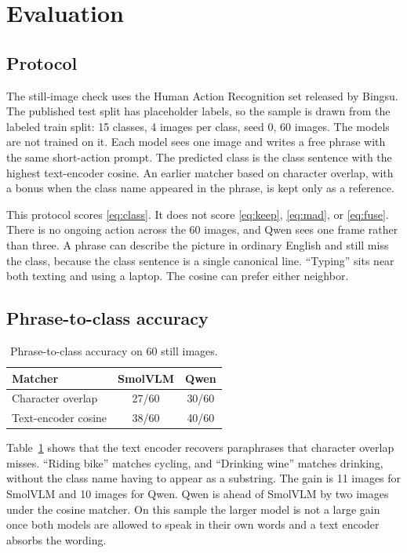 \section{Evaluation}
\label{sec:evaluation}

\subsection{Protocol}

The still-image check uses the Human Action Recognition set released by
Bingsu. The published test split has placeholder labels, so the sample is
drawn from the labeled train split: 15 classes, 4 images per class, seed 0,
60 images. The models are not trained on it. Each model sees one image and
writes a free phrase with the same short-action prompt. The predicted class
is the class sentence with the highest text-encoder cosine. An earlier
matcher based on character overlap, with a bonus when the class name
appeared in the phrase, is kept only as a reference.

This protocol scores \eqref{eq:class}. It does not score
\eqref{eq:keep}, \eqref{eq:mad}, or \eqref{eq:fuse}. There is no ongoing
action across the 60 images, and Qwen sees one frame rather than three.
A phrase can describe the picture in ordinary English and still miss the
class, because the class sentence is a single canonical line. ``Typing''
sits near both texting and using a laptop. The cosine can prefer either
neighbor.

\subsection{Phrase-to-class accuracy}

\begin{table}[t]
\caption{Phrase-to-class accuracy on 60 still images.}
\label{tab:still}
\centering
\begin{tabular}{lcc}
\toprule
Matcher & SmolVLM & Qwen \\
\midrule
Character overlap & 27/60 & 30/60 \\
Text-encoder cosine & 38/60 & 40/60 \\
\bottomrule
\end{tabular}
\end{table}

Table~\ref{tab:still} shows that the text encoder recovers paraphrases that
character overlap misses. ``Riding bike'' matches cycling, and ``Drinking
wine'' matches drinking, without the class name having to appear as a
substring. The gain is 11 images for SmolVLM and 10 images for Qwen. Qwen
is ahead of SmolVLM by two images under the cosine matcher. On this sample
the larger model is not a large gain once both models are allowed to speak
in their own words and a text encoder absorbs the wording.

